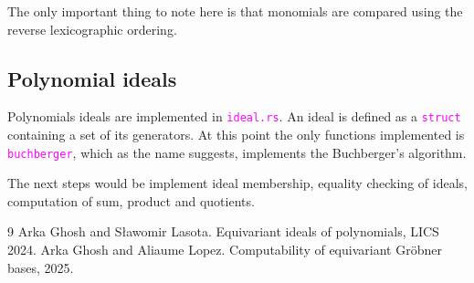\documentclass[12pt,a4paper,article]{memoir}
\newcommand{\code}[1]{\texttt{\textcolor{magenta}{#1}}}
\theoremstyle{definition}
\begin{document}
The only important thing to note here is that monomials are compared using the reverse lexicographic ordering.
%
\subsection{Polynomial ideals}
%
Polynomials ideals are implemented in \code{ideal.rs}.
An ideal is defined as a \code{struct} containing a set of its generators.
At this point the only functions implemented is \code{buchberger},
which as the name suggests,
implements the Buchberger's algorithm.

The next steps would be implement ideal membership, equality checking of ideals,
computation of sum, product and quotients.
%
\begin{thebibliography}{9}
Arka Ghosh and S\l{}awomir Lasota. Equivariant ideals of polynomials, LICS 2024.
%
Arka Ghosh and Aliaume Lopez. Computability of equivariant
Gr\"{o}bner bases, 2025.
%
\end{thebibliography}
%
\end{document}
